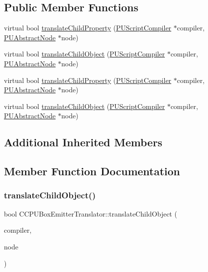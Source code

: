 \subsection*{Public Member Functions}
\begin{DoxyCompactItemize}
\item 
virtual bool \hyperlink{classCCPUBoxEmitterTranslator_a9ee6f52bd6ab75316802eb8501775c9e}{translate\+Child\+Property} (\hyperlink{classPUScriptCompiler}{P\+U\+Script\+Compiler} $\ast$compiler, \hyperlink{classPUAbstractNode}{P\+U\+Abstract\+Node} $\ast$node)
\item 
virtual bool \hyperlink{classCCPUBoxEmitterTranslator_ab8161c6f40699790a206f0a39ac80499}{translate\+Child\+Object} (\hyperlink{classPUScriptCompiler}{P\+U\+Script\+Compiler} $\ast$compiler, \hyperlink{classPUAbstractNode}{P\+U\+Abstract\+Node} $\ast$node)
\item 
virtual bool \hyperlink{classCCPUBoxEmitterTranslator_ada236c8cb79238baf289d30c266a09fa}{translate\+Child\+Property} (\hyperlink{classPUScriptCompiler}{P\+U\+Script\+Compiler} $\ast$compiler, \hyperlink{classPUAbstractNode}{P\+U\+Abstract\+Node} $\ast$node)
\item 
virtual bool \hyperlink{classCCPUBoxEmitterTranslator_a880e307e7711fd1a0d64819e5076dfda}{translate\+Child\+Object} (\hyperlink{classPUScriptCompiler}{P\+U\+Script\+Compiler} $\ast$compiler, \hyperlink{classPUAbstractNode}{P\+U\+Abstract\+Node} $\ast$node)
\end{DoxyCompactItemize}
\subsection*{Additional Inherited Members}


\subsection{Member Function Documentation}
\mbox{\label{classCCPUBoxEmitterTranslator_ab8161c6f40699790a206f0a39ac80499}} 
\subsubsection{\texorpdfstring{translate\+Child\+Object()}{translateChildObject()}\hspace{0.1cm}{\footnotesize\ttfamily [1/2]}}
{\footnotesize\ttfamily bool C\+C\+P\+U\+Box\+Emitter\+Translator\+::translate\+Child\+Object (\begin{DoxyParamCaption}\item[{\hyperlink{classPUScriptCompiler}{P\+U\+Script\+Compiler} $\ast$}]{compiler,  }\item[{\hyperlink{classPUAbstractNode}{P\+U\+Abstract\+Node} $\ast$}]{node }\end{DoxyParamCaption})\hspace{0.3cm}{\ttfamily [virtual]}}

